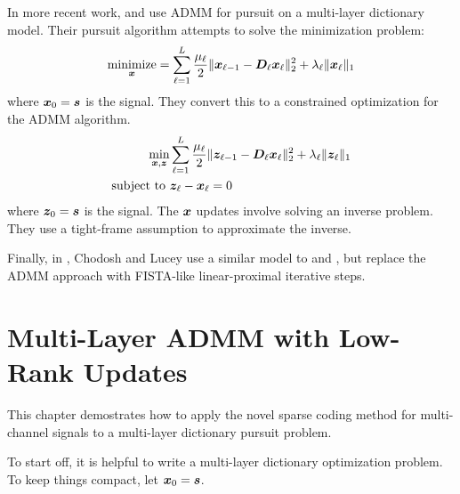 In more recent work, \cite{murdock2018deep} and \cite{chodosh2018deep} use ADMM for pursuit on a multi-layer dictionary model. Their pursuit algorithm attempts to solve the minimization problem:
\begin{equation}
\operatorname*{\text{minimize}}_{\bm{x}} = \sum_{\ell = 1}^{L} \frac{\mu_{\ell}}{2}\|\bm{x}_{\ell - 1} -\bm{D}_{\ell}\bm{x}_{\ell}\|_2^2 + \lambda_{\ell}\|\bm{x}_{\ell}\|_1
\end{equation}
where $\bm{x}_0 = \bm{s}$ is the signal. They convert this to a constrained optimization for the ADMM algorithm.
\begin{equation}
\begin{aligned}
\min_{\bm{x},\bm{z}} & \sum_{\ell = 1}^{L} \frac{\mu_{\ell}}{2}\|\bm{z}_{\ell - 1} -\bm{D}_{\ell}\bm{x}_{\ell}\|_2^2 + \lambda_{\ell}\|\bm{z}_{\ell}\|_1 \\
\text{subject to } & \bm{z}_{\ell} - \bm{x}_{\ell} = 0
\end{aligned}
\end{equation}
where $\bm{z}_0 = \bm{s}$ is the signal. The $\bm{x}$ updates involve solving an inverse problem. They use a tight-frame assumption to approximate the inverse.

Finally, in \cite{chodosh2020use}, Chodosh and Lucey use a similar model to \cite{murdock2018deep} and \cite{chodosh2018deep}, but replace the ADMM approach with FISTA-like linear-proximal iterative steps.

\section{Multi-Layer ADMM with Low-Rank Updates}
This chapter demostrates how to apply the novel sparse coding method for multi-channel signals to a multi-layer dictionary pursuit problem.

To start off, it is helpful to write a multi-layer dictionary optimization problem. To keep things compact, let $\bm{x}_0 = \bm{s}$.

